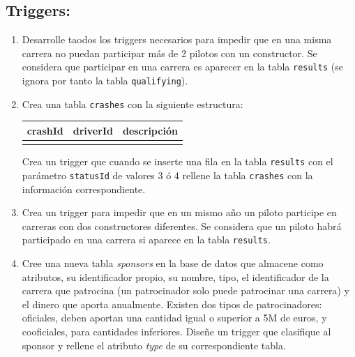 \documentclass{db-practice}
\begin{document}
\subsection*{Triggers:}

\begin{enumerate}
    
    \item Desarrolle taodos los triggers necesarios para impedir que en una misma carrera no puedan participar más de 2 pilotos con un constructor. Se considera que participar en una carrera es aparecer en la tabla \texttt{results} (se ignora por tanto la tabla \texttt{qualifying}).
        
    \item Crea una tabla \texttt{crashes} con la siguiente estructura:
    \begin{table}[H]
    \centering
    \begin{tabular}{@{}lll@{}}
    \toprule
    \multicolumn{1}{c}{\textbf{crashId}} & \multicolumn{1}{c}{\textbf{driverId}} & \multicolumn{1}{c}{\textbf{descripción}} \\ \midrule
                                         &                                       &                                          \\ \bottomrule
    \end{tabular}
    \end{table}

    Crea un trigger que cuando se inserte una fila en la tabla \texttt{results} con el parámetro \texttt{statusId} de valores 3 ó 4 rellene la tabla \texttt{crashes} con la información correspondiente.

    \item Crea un trigger para impedir que en un mismo año un piloto participe en carreras con dos constructores diferentes. Se considera que un piloto habrá participado en una carrera si aparece en la tabla \texttt{results}.
    
    \item Cree una nueva tabla \textit{sponsors} en la base de datos que almacene como atributos, su identificador propio, su nombre, tipo, el identificador de la carrera que patrocina (un patrocinador solo puede patrocinar una carrera) y el dinero que aporta anualmente. Existen dos tipos de patrocinadores: oficiales, deben aportan una cantidad igual o superior a 5M de euros, y cooficiales, para cantidades inferiores. Diseñe un trigger que clasifique al sponsor y rellene el atributo \textit{type} de su correspondiente tabla.
    

\end{enumerate}
\end{document}
